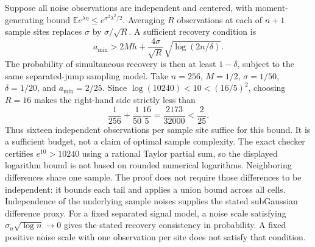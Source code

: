 Suppose all noise observations are independent and centered, with moment-generating bound $\mathbb E e^{\lambda\eta}\le e^{\sigma^2\lambda^2/2}$. Averaging $R$ observations at each of $n+1$ sample sites replaces $\sigma$ by $\sigma/\sqrt R$. A sufficient recovery condition is
\[
a_{\min}>2Mh+\frac{4\sigma}{\sqrt R}\sqrt{\log(2n/\delta)}.
\]
The probability of simultaneous recovery is then at least $1-\delta$, subject to the same separated-jump sampling model.
Take $n=256$, $M=1/2$, $\sigma=1/50$, $\delta=1/20$, and $a_{\min}=2/25$. Since $\log(10240)<10<(16/5)^2$, choosing $R=16$ makes the right-hand side strictly less than
\[
\frac1{256}+\frac1{50}\frac{16}{5}
=\frac{2173}{32000}<\frac2{25}.
\]
Thus sixteen independent observations per sample site suffice for this bound. It is a sufficient budget, not a claim of optimal sample complexity. The exact checker certifies $e^{10}>10240$ using a rational Taylor partial sum, so the displayed logarithm bound is not based on rounded numerical logarithms.
Neighboring differences share one sample. The proof does not require those differences to be independent: it bounds each tail and applies a union bound across all cells. Independence of the underlying sample noises supplies the stated subGaussian difference proxy.
For a fixed separated signal model, a noise scale satisfying $\sigma_n\sqrt{\log n}\to0$ gives the stated recovery consistency in probability. A fixed positive noise scale with one observation per site does not satisfy that condition.


